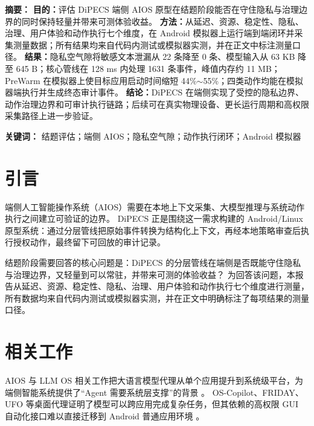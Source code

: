 \documentclass[12pt,a4paper]{article}
\begin{document}
\makecover
\clearpage
{}

{\hypersetup{linkcolor=black}\tableofcontents}
\newpage

\begin{dipecsabstract}
\noindent\textbf{ 摘要：}
\textbf{目的：}评估 DiPECS 端侧 AIOS 原型在结题阶段能否在守住隐私与治理边界的同时保持轻量并带来可测体验收益。
\textbf{方法：}从延迟、资源、稳定性、隐私、治理、用户体验和动作执行七个维度，在 Android 模拟器上运行端到端闭环并采集测量数据；所有结果均来自代码内测试或模拟器实测，并在正文中标注测量口径。
\textbf{结果：}隐私空气隙将敏感文本泄漏从 22 条降至 0 条、模型输入从 63 KB 降至 645 B；核心管线在 128 ms 内处理 1631 条事件，峰值内存约 11 MB；PreWarm 在模拟器上使目标应用启动时间缩短 44\%$\sim$55\%；四类动作均能在模拟器端执行并生成终态审计事件。
\textbf{结论：}DiPECS 在端侧实现了受控的隐私边界、动作治理边界和可审计执行链路；后续可在真实物理设备、更长运行周期和高权限采集路径上进一步验证。

\vspace{0.5em}
\noindent\textbf{ 关键词：} 结题评估；端侧 AIOS；隐私空气隙；动作执行闭环；Android 模拟器
\end{dipecsabstract}

\section{引言}\label{sec:intro}

端侧人工智能操作系统（AIOS）需要在本地上下文采集、大模型推理与系统动作执行之间建立可验证的边界。
DiPECS 正是围绕这一需求构建的 Android/Linux 原型系统：通过分层管线把原始事件转换为结构化上下文，再经本地策略审查后执行授权动作，最终留下可回放的审计记录。

结题阶段需要回答的核心问题是：DiPECS 的分层管线在端侧是否既能守住隐私与治理边界，又轻量到可以常驻，并带来可测的体验收益？
为回答该问题，本报告从延迟、资源、稳定性、隐私、治理、用户体验和动作执行七个维度进行测量，所有数据均来自代码内测试或模拟器实测，并在正文中明确标注了每项结果的测量口径。

\section{相关工作}\label{sec:related}

AIOS 与 LLM OS 相关工作把大语言模型代理从单个应用提升到系统级平台，为端侧智能系统提供了``Agent 需要系统层支撑''的背景 \cite{aios,memgpt}。
OS-Copilot、FRIDAY、UFO 等桌面代理证明了模型可以跨应用完成复杂任务，但其依赖的高权限 GUI 自动化接口难以直接迁移到 Android 普通应用环境 \cite{os-copilot,os-copilot-page,ufo}。
\end{document}
